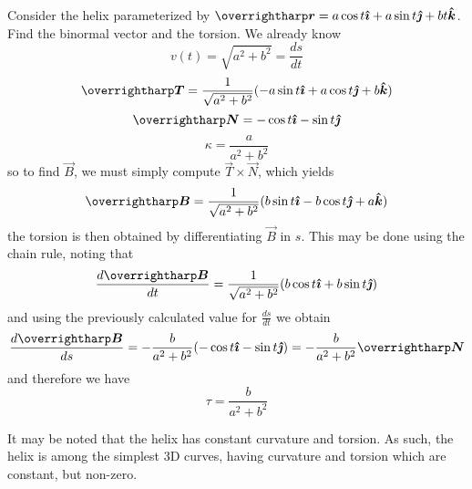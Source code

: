 \documentclass[../main.tex]{subfiles}
\begin{document}
                \begin{example}{}{}
                        Consider the helix parameterized by \(\vec{r}=a\cos{t}\i+a\sin{t}\j+bt\k\). Find the binormal vector and the torsion.
                        \tcblower
                        We already know
                        \[
                        v(t)=\sqrt{a^2+b^2}=\frac{ds}{dt}
                        \]
                        \[
                        \vec{T}=\frac{1}{\sqrt{a^2+b^2}}(-a\sin{t}\i+a\cos{t}\j+b\k)
                        \]
                        \[
                        \vec{N}=-\cos{t}\i-\sin{t}\j
                        \]
                        \[
                        \kappa=\frac{a}{a^2+b^2}
                        \]
                        so to find \(\vec{B}\), we must simply compute \(\vec{T}\times\vec{N}\), which yields
                        \[
                        \vec{B}=\frac{1}{\sqrt{a^2+b^2}}(b\sin{t}\i-b\cos{t}\j+a\k)
                        \]
                        the torsion is then obtained by differentiating \(\vec{B}\) in \(s\). This may be done using the chain rule, noting that
                        \[
                        \frac{d\vec{B}}{dt}=\frac{1}{\sqrt{a^2+b^2}}(b\cos{t}\i+b\sin{t}\j)
                        \]
                        and using the previously calculated value for \(\frac{ds}{dt}\) we obtain
                        \[
                        \frac{d\vec{B}}{ds}=-\frac{b}{a^2+b^2}(-\cos{t}\i-\sin{t}\j)=-\frac{b}{a^2+b^2}\vec{N}
                        \]
                        and therefore we have
                        \[
                        \tau=\frac{b}{a^2+b^2}
                        \]
                \end{example}
                It may be noted that the helix has constant curvature and torsion. As such, the helix is among the simplest 3D curves, having curvature and torsion which are constant, but non-zero.
\end{document}
